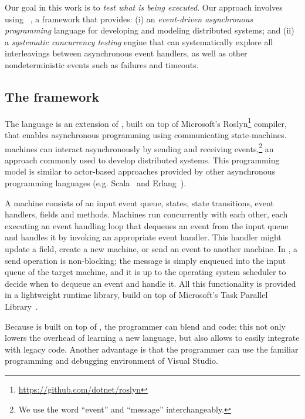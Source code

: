 Our goal in this work is to \emph{test what is being executed}. Our approach involves using \psharp~\cite{deligiannis2015psharp}, a framework that provides: (i) an \emph{event-driven asynchronous programming} language for developing and modeling distributed systems; and (ii) a \emph{systematic concurrency testing} engine that can systematically explore all interleavings between asynchronous event handlers, as well as other nondeterministic events such as failures and timeouts.

\subsection{The \psharp framework}
\label{sec:method:psharp}

The \psharp language is an extension of \csharp, built on top of Microsoft's Roslyn\footnote{\url{https://github.com/dotnet/roslyn}} compiler, that enables asynchronous programming using communicating state-machines. \psharp machines can interact asynchronously by sending and receiving events,\footnote{We use the word ``event'' and ``message'' interchangeably.} an approach commonly used to develop distributed systems. This programming model is similar to actor-based approaches provided by other asynchronous programming languages (e.g. Scala~\cite{odersky2008programming} and Erlang~\cite{armstrong1996erlang}).

A \psharp machine consists of an input event queue, states, state transitions, event handlers, fields and methods. Machines run concurrently with each other, each executing an event handling loop that dequeues an event from the input queue and handles it by invoking an appropriate event handler. This handler might update a field, create a new machine, or send an event to another machine. In \psharp, a send operation is non-blocking; the message is simply enqueued into the input queue of the target machine, and it is up to the operating system scheduler to decide when to dequeue an event and handle it. All this functionality is provided in a lightweight runtime library, build on top of Microsoft's Task Parallel Library~\cite{leijen2009tpl}.

Because \psharp is built on top of \csharp, the programmer can blend \psharp and \csharp code; this not only lowers the overhead of learning a new language, but also allows \psharp to easily integrate with legacy code. Another advantage is that the programmer can use the familiar programming and debugging environment of Visual Studio.

